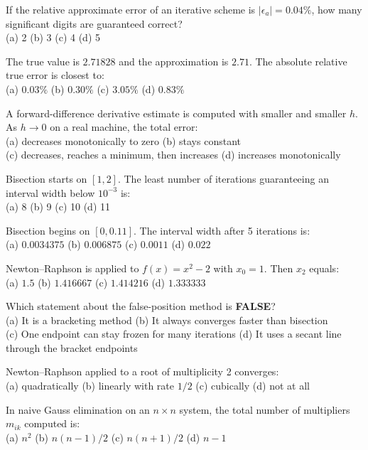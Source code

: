 \begin{mcqbox}
\mq If the relative approximate error of an iterative scheme is $|\epsilon_a| = 0.04\%$, how many significant digits are guaranteed correct?\\
(a) 2 \quad (b) 3 \quad (c) 4 \quad (d) 5

\mq The true value is $2.71828$ and the approximation is $2.71$. The absolute relative true error is closest to:\\
(a) $0.03\%$ \quad (b) $0.30\%$ \quad (c) $3.05\%$ \quad (d) $0.83\%$

\mq A forward-difference derivative estimate is computed with smaller and smaller $h$. As $h \to 0$ on a real machine, the total error:\\
(a) decreases monotonically to zero \quad (b) stays constant \\
(c) decreases, reaches a minimum, then increases \quad (d) increases monotonically

\mq Bisection starts on $[1,2]$. The least number of iterations guaranteeing an interval width below $10^{-3}$ is:\\
(a) 8 \quad (b) 9 \quad (c) 10 \quad (d) 11

\mq Bisection begins on $[0, 0.11]$. The interval width after 5 iterations is:\\
(a) $0.0034375$ \quad (b) $0.006875$ \quad (c) $0.0011$ \quad (d) $0.022$

\mq Newton--Raphson is applied to $f(x)=x^2-2$ with $x_0=1$. Then $x_2$ equals:\\
(a) $1.5$ \quad (b) $1.416667$ \quad (c) $1.414216$ \quad (d) $1.333333$

\mq Which statement about the false-position method is \textbf{FALSE}?\\
(a) It is a bracketing method \quad (b) It always converges faster than bisection \\
(c) One endpoint can stay frozen for many iterations \quad (d) It uses a secant line through the bracket endpoints

\mq Newton--Raphson applied to a root of multiplicity 2 converges:\\
(a) quadratically \quad (b) linearly with rate $1/2$ \quad (c) cubically \quad (d) not at all

\mq In naive Gauss elimination on an $n \times n$ system, the total number of multipliers $m_{ik}$ computed is:\\
(a) $n^2$ \quad (b) $n(n-1)/2$ \quad (c) $n(n+1)/2$ \quad (d) $n-1$


\end{mcqbox}
